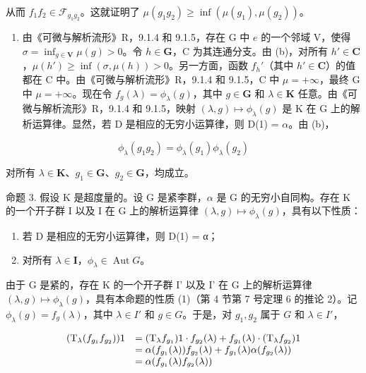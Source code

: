 从而 \(f_{1}f_{2}\in \mathcal{F}_{g_{1}g_{2}}\)。这就证明了 \(\mu (g_1g_2)\geqslant \inf (\mu (g_1),\mu (g_2))\)。

\begin{enumerate}
\def\labelenumi{(\alph{enumi})}
\setcounter{enumi}{2}
\tightlist
\item
  由《可微与解析流形》R，9.1.4 和 9.1.5，存在 G 中 \(e\) 的一个邻域 V，使得 \(\sigma = \inf_{g \in \mathbf{V}} \mu(g) > 0\)。令 \(h \in \mathbf{G}\)，C 为其连通分支。由 (b)，对所有 \(h' \in \mathbf{C}\)，\(\mu(h') \geqslant \inf(\sigma, \mu(h)) > 0\)。另一方面，函数 \(f_h'\)（其中 \(h' \in \mathbf{C}\)）的值都在 C 中。由《可微与解析流形》R，9.1.4 和 9.1.5，C 中 \(\mu = +\infty\)，最终 G 中 \(\mu = +\infty\)。现在令 \(f_g(\lambda) = \phi_{\lambda}(g)\)，其中 \(g \in \mathbf{G}\) 和 \(\lambda \in \mathbf{K}\) 任意。由《可微与解析流形》R，9.1.4 和 9.1.5，映射 \((\lambda, g) \mapsto \phi_{\lambda}(g)\) 是 K 在 G 上的解析运算律。显然，若 D 是相应的无穷小运算律，则 D(1) = \(\alpha\)。由 (b)，
\end{enumerate}

\[
\phi_ {\lambda} (g _ {1} g _ {2}) = \phi_ {\lambda} (g _ {1}) \phi_ {\lambda} (g _ {2})
\]

对所有 \(\lambda \in \mathbf{K}\)、\(g_{1} \in \mathbf{G}\)、\(g_{2} \in \mathbf{G}\)，均成立。

命题 3. 假设 K 是超度量的。设 G 是紧李群，\(\alpha\) 是 G 的无穷小自同构。存在 K 的一个开子群 I 以及 I 在 G 上的解析运算律 \((\lambda, g) \mapsto \phi_{\lambda}(g)\)，具有以下性质：

\begin{enumerate}
\def\labelenumi{(\arabic{enumi})}
\item
  若 D 是相应的无穷小运算律，则 D(1) = α；
\item
  对所有 \(\lambda \in \mathbf{I}\)，\(\phi_{\lambda} \in \operatorname{Aut} G\)。
\end{enumerate}

由于 G 是紧的，存在 K 的一个开子群 I' 以及 I' 在 G 上的解析运算律 \((\lambda, g) \mapsto \phi_{\lambda}(g)\)，具有本命题的性质 (1)（第 4 节第 7 号定理 6 的推论 2）。记 \(\phi_{\lambda}(g) = f_{g}(\lambda)\)，其中 \(\lambda \in I'\) 和 \(g \in G\)。于是，对 \(g_{1}, g_{2}\) 属于 \(G\) 和 \(\lambda \in I'\)，

\[
\begin{array}{r l} (\mathrm{T} _ {\lambda} (f _ {g _ {1}} f _ {g _ {2}})) 1 & = (\mathrm{T} _ {\lambda} f _ {g _ {1}}) 1 \cdot f _ {g _ {2}} (\lambda) + f _ {g _ {1}} (\lambda) \cdot (\mathrm{T} _ {\lambda} f _ {g _ {2}}) 1 \\ & = \alpha (f _ {g _ {1}} (\lambda)) f _ {g _ {2}} (\lambda) + f _ {g _ {1}} (\lambda) \alpha (f _ {g _ {2}} (\lambda)) \\ & = \alpha (f _ {g _ {1}} (\lambda) f _ {g _ {2}} (\lambda)) \end{array}
\]

